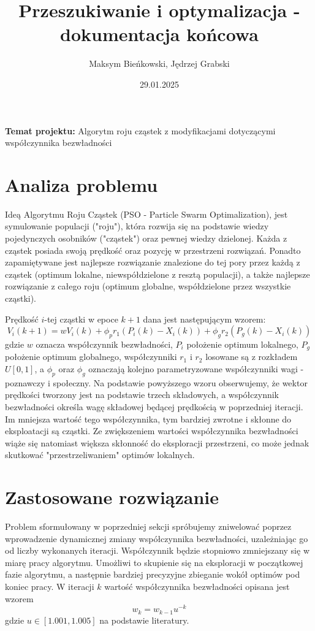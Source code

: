 \documentclass[12pt]{article}
\title{Przeszukiwanie i optymalizacja - dokumentacja końcowa}
\author{Maksym Bieńkowski, Jędrzej Grabski}
\date{29.01.2025}
\begin{document}
\maketitle
\begin{centering}
	\textbf{Temat projektu: }Algorytm roju cząstek z modyfikacjami dotyczącymi współczynnika bezwładności
\end{centering}

\section{Analiza problemu}

Ideą Algorytmu Roju Cząstek (PSO - Particle Swarm Optimalization), jest symulowanie populacji ("roju"),
która rozwija się na podstawie wiedzy pojedynczych osobników ("cząstek") oraz pewnej wiedzy dzielonej.
Każda z cząstek posiada swoją prędkość oraz pozycję w przestrzeni rozwiązań.
Ponadto zapamiętywane jest najlepsze rozwiązanie znalezione do tej pory przez każdą z cząstek (optimum lokalne, niewspółdzielone
z resztą populacji), a także najlepsze rozwiązanie z całego roju (optimum globalne, współdzielone przez wszystkie cząstki).

Prędkość \(i\)-tej cząstki w epoce \(k+1\) dana jest następującym wzorem:\[V_i(k+1) = wV_i(k) + \phi_p r_1(P_i(k) - X_i(k)) + \phi_g r_2(P_g(k) - X_i(k))\]
gdzie \(w\) oznacza współczynnik bezwładności, \(P_i\) położenie optimum lokalnego, \(P_g\) położenie optimum globalnego, współczynniki \(r_1\) i \(r_2\)
losowane są z rozkładem \(U[0, 1]\), a \(\phi_p\) oraz \(\phi_g\) oznaczają kolejno parametryzowane współczynniki wagi - poznawczy i społeczny. Na podstawie powyższego wzoru obserwujemy,
że wektor prędkości tworzony jest na podstawie trzech składowych, a współczynnik bezwładności określa wagę składowej będącej
prędkością w poprzedniej iteracji. Im mniejsza wartość tego współczynnika, tym bardziej zwrotne i skłonne do eksploatacji są cząstki.
Ze zwiększeniem wartości współczynnika bezwładności wiąże się natomiast większa skłonność do eksploracji przestrzeni, co może jednak skutkować "przestrzeliwaniem"\space
optimów lokalnych.



\section{Zastosowane rozwiązanie}

Problem sformułowany w poprzedniej sekcji spróbujemy zniwelować poprzez wprowadzenie dynamicznej zmiany współczynnika bezwładności,
uzależniając go od liczby wykonanych iteracji. Współczynnik będzie stopniowo zmniejszany się w miarę pracy algorytmu.
Umożliwi to skupienie się na eksploracji w początkowej fazie algorytmu, a następnie bardziej precyzyjne
zbieganie wokół optimów pod koniec pracy. W iteracji \(k\) wartość współczynnika bezwładności opisana jest wzorem
\[w_{k} = w_{k-1}u^{-k}\]
gdzie  \(u \in [1.001, 1.005]\) na podstawie literatury.
\end{document}
